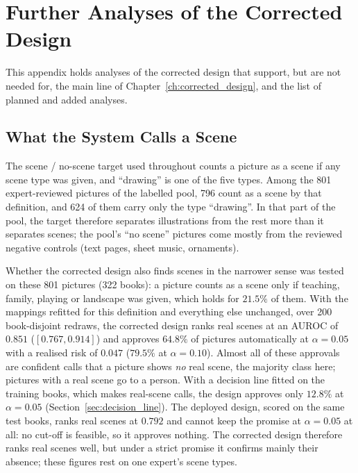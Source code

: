 \chapter{Further Analyses of the Corrected Design}
\label{app:corrected_more}

This appendix holds analyses of the corrected design that support, but are not needed for, the main line of Chapter~\ref{ch:corrected_design}, and the list of planned and added analyses.

\section{What the System Calls a Scene}
\label{sec:scene_definition}

The scene / no-scene target used throughout counts a picture as a scene if any scene type was given, and ``drawing'' is one of the five types. Among the 801 expert-reviewed pictures of the labelled pool, 796 count as a scene by that definition, and 624 of them carry only the type ``drawing''. In that part of the pool, the target therefore separates illustrations from the rest more than it separates scenes; the pool's ``no scene'' pictures come mostly from the reviewed negative controls (text pages, sheet music, ornaments).

Whether the corrected design also finds scenes in the narrower sense was tested on these 801 pictures (322 books): a picture counts as a scene only if teaching, family, playing or landscape was given, which holds for $21.5\%$ of them. With the mappings refitted for this definition and everything else unchanged, over 200 book-disjoint redraws, the corrected design ranks real scenes at an AUROC of $0.851$ ($[0.767, 0.914]$) and approves $64.8\%$ of pictures automatically at $\alpha = 0.05$ with a realised risk of $0.047$ ($79.5\%$ at $\alpha=0.10$). Almost all of these approvals are confident calls that a picture shows \emph{no} real scene, the majority class here; pictures with a real scene go to a person. With a decision line fitted on the training books, which makes real-scene calls, the design approves only $12.8\%$ at $\alpha=0.05$ (Section~\ref{sec:decision_line}). The deployed design, scored on the same test books, ranks real scenes at $0.792$ and cannot keep the promise at $\alpha = 0.05$ at all: no cut-off is feasible, so it approves nothing. The corrected design therefore ranks real scenes well, but under a strict promise it confirms mainly their absence; these figures rest on one expert's scene types.

